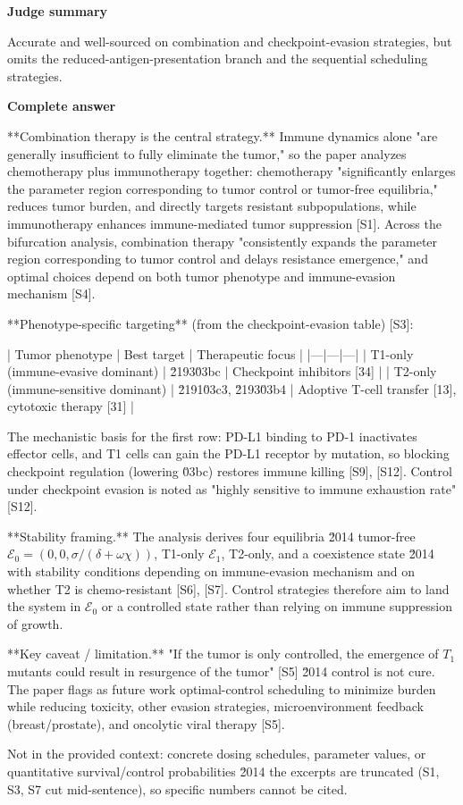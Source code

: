 \documentclass[10pt]{article}
\begin{document}
\textbf{Judge summary}
\begin{EvidenceText}
Accurate and well-sourced on combination and checkpoint-evasion strategies, but omits the reduced-antigen-presentation branch and the sequential scheduling strategies.
\end{EvidenceText}

\textbf{Complete answer}
\begin{AnswerText}
**Combination therapy is the central strategy.** Immune dynamics alone "are generally insufficient to fully eliminate the tumor," so the paper analyzes chemotherapy plus immunotherapy together: chemotherapy "significantly enlarges the parameter region corresponding to tumor control or tumor-free equilibria," reduces tumor burden, and directly targets resistant subpopulations, while immunotherapy enhances immune-mediated tumor suppression [S1]. Across the bifurcation analysis, combination therapy "consistently expands the parameter region corresponding to tumor control and delays resistance emergence," and optimal choices depend on both tumor phenotype and immune-evasion mechanism [S4].

**Phenotype-specific targeting** (from the checkpoint-evasion table) [S3]:

| Tumor phenotype | Best target | Therapeutic focus |
|---|---|---|
| T1-only (immune-evasive dominant) | \u2193\u03bc | Checkpoint inhibitors [34] |
| T2-only (immune-sensitive dominant) | \u2191\u03c3, \u2193\u03b4 | Adoptive T-cell transfer [13], cytotoxic therapy [31] |

The mechanistic basis for the first row: PD-L1 binding to PD-1 inactivates effector cells, and T1 cells can gain the PD-L1 receptor by mutation, so blocking checkpoint regulation (lowering \u03bc) restores immune killing [S9], [S12]. Control under checkpoint evasion is noted as "highly sensitive to immune exhaustion rate" [S12].

**Stability framing.** The analysis derives four equilibria \u2014 tumor-free $\mathcal{E}_0=(0,0,\sigma/(\delta+\omega\chi))$, T1-only $\mathcal{E}_1$, T2-only, and a coexistence state \u2014 with stability conditions depending on immune-evasion mechanism and on whether T2 is chemo-resistant [S6], [S7]. Control strategies therefore aim to land the system in $\mathcal{E}_0$ or a controlled state rather than relying on immune suppression of growth.

**Key caveat / limitation.** "If the tumor is only controlled, the emergence of $T_1$ mutants could result in resurgence of the tumor" [S5] \u2014 control is not cure. The paper flags as future work optimal-control scheduling to minimize burden while reducing toxicity, other evasion strategies, microenvironment feedback (breast/prostate), and oncolytic viral therapy [S5].

Not in the provided context: concrete dosing schedules, parameter values, or quantitative survival/control probabilities \u2014 the excerpts are truncated (S1, S3, S7 cut mid-sentence), so specific numbers cannot be cited.
\end{AnswerText}
\end{document}
